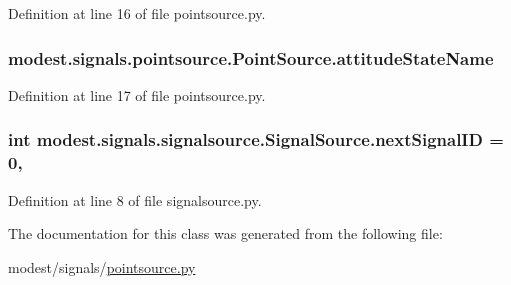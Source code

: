 Definition at line 16 of file pointsource.\+py.

\subsubsection[{\texorpdfstring{attitude\+State\+Name}{attitudeStateName}}]{\setlength{\rightskip}{0pt plus 5cm}modest.\+signals.\+pointsource.\+Point\+Source.\+attitude\+State\+Name}\hypertarget{classmodest_1_1signals_1_1pointsource_1_1PointSource_a0924a2233bb4fd23e50d024e4f1b048e}{}\label{classmodest_1_1signals_1_1pointsource_1_1PointSource_a0924a2233bb4fd23e50d024e4f1b048e}


Definition at line 17 of file pointsource.\+py.

\subsubsection[{\texorpdfstring{next\+Signal\+ID}{nextSignalID}}]{\setlength{\rightskip}{0pt plus 5cm}int modest.\+signals.\+signalsource.\+Signal\+Source.\+next\+Signal\+ID = 0\hspace{0.3cm}{\ttfamily [static]}, {\ttfamily [inherited]}}\hypertarget{classmodest_1_1signals_1_1signalsource_1_1SignalSource_a453eafb550b551adbec0903deb63dfce}{}\label{classmodest_1_1signals_1_1signalsource_1_1SignalSource_a453eafb550b551adbec0903deb63dfce}


Definition at line 8 of file signalsource.\+py.



The documentation for this class was generated from the following file\+:\begin{DoxyCompactItemize}
\item 
modest/signals/\hyperlink{pointsource_8py}{pointsource.\+py}\end{DoxyCompactItemize}
